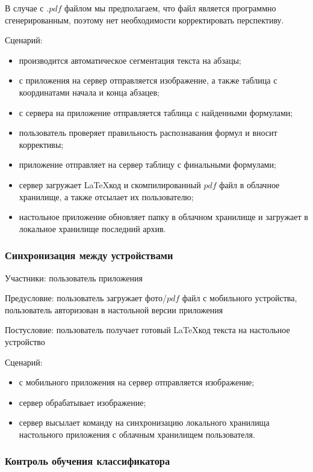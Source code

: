 В случае с $.pdf$ файлом мы предполагаем, что файл является программно сгенерированным, поэтому нет необходимости корректировать перспективу.

Сценарий:
\begin{itemize}
    \item производится автоматическое сегментация текста на абзацы;
    \item с приложения на сервер отправляется изображение, а также таблица с координатами начала и конца абзацев;
    \item с сервера на приложение отправляется таблица с найденными формулами;
    \item пользователь проверяет правильность распознавания формул и вносит коррективы;
    \item приложение отправляет на сервер таблицу с финальными формулами;
    \item сервер загружает \LaTeX\-код и скомпилированный $pdf$ файл в облачное хранилище, а также отсылает их пользователю;
    \item настольное приложение обновляет папку в облачном хранилище и загружает в локальное хранилище последний архив.
\end{itemize}

\subsubsection{Синхронизация между устройствами}
Участники: пользователь приложения

Предусловие: пользователь загружает фото/$pdf$ файл с мобильного устройства, пользователь авторизован в настольной версии приложения

Постусловие: пользователь получает готовый \LaTeX\-код текста на настольное устройство

Сценарий:
\begin{itemize}
    \item с мобильного приложения на сервер отправляется изображение;
    \item сервер обрабатывает изображение;
    \item сервер высылает команду на синхронизацию локального хранилища настольного приложения с облачным хранилищем пользователя.
\end{itemize}

\subsubsection{Контроль обучения классификатора}

